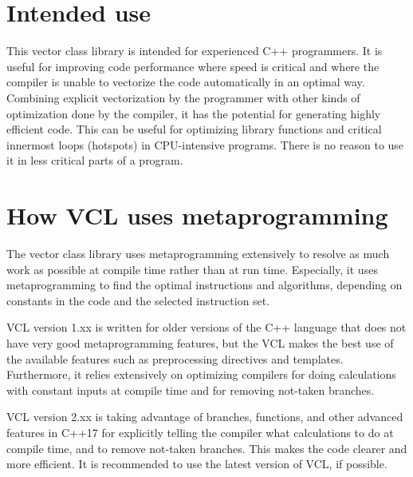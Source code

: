\documentclass[vcl_manual.tex]{subfiles}
\begin{document}
\section{Intended use} \label{IntendedUse}
This vector class library is intended for experienced C++ programmers. It is useful for improving code performance where speed is critical and where the compiler is unable to vectorize the code automatically in an optimal way. Combining explicit vectorization by the programmer with other kinds of optimization done by the compiler, it has the potential for generating highly efficient code. This can be useful for optimizing library functions and critical innermost loops (hotspots) in CPU-intensive programs. There is no reason to use it in less critical parts of a program.

\section{How VCL uses metaprogramming} \label{HowVCLUsesMetaprogramming}
The vector class library uses metaprogramming extensively to resolve as much work as possible at compile time rather than at run time. Especially, it uses metaprogramming to find the optimal instructions and algorithms, depending on constants in the code and the selected instruction set.

VCL version 1.xx is written for older versions of the C++ language that does not have very good metaprogramming features, but the VCL makes the best use of the available features such as preprocessing directives and templates. Furthermore, it relies extensively on optimizing compilers for  doing calculations with constant inputs at compile time and for removing not-taken branches.

VCL version 2.xx is taking advantage of  branches,  functions, and other advanced features in 
C++17 for explicitly telling the compiler what calculations to do at compile time, and to remove not-taken branches. This makes the code clearer and more efficient. It is recommended to use the latest version of VCL, if possible.
\end{document}
